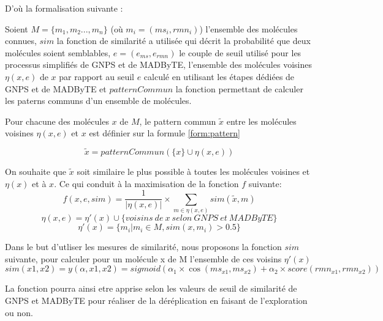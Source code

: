 \documentclass[12pt, french, latin.medieval, a4paper]{report}
\begin{document}
        D’où la formalisation suivante :

        Soient $M =\{ {m_{1}},{m_{2}}...,{m_{n}} \}$ (où $m_{i} = (ms_{i}, rmn_{i})$) l'ensemble des molécules connues, $sim$ la fonction de similarité a utilisée qui décrit la probabilité que deux molécules soient semblables, $e = (e_{ms}, e_{rmn})$ le couple de seuil utilisé pour les processus simplifiés de GNPS et de MADByTE, 
        l'ensemble des molécules voisines $\eta(x,e)$ de $x$ par rapport au seuil $e$ calculé en utilisant les étapes dédiées de GNPS et de MADByTE et $patternCommun$ la fonction permettant de calculer les paterns communs d'un ensemble de molécules.
        
        Pour chacune des molécules $x$ de $M$, le pattern commun $\tilde{x}$ entre les molécules voisines $\eta(x,e)$ et $x$ est définier sur la formule \ref{form:pattern}
        
        \begin{equation}
            \tilde{x} = patternCommun( \{x\} \cup \eta(x,e))
            \label{form:pattern}
        \end{equation}
        
        On souhaite que $\tilde{x}$ soit similaire le plus possible à toutes les molécules voisines et $\eta(x)$ et à $x$. Ce qui conduit à la maximisation de la fonction $f$ suivante:
        \begin{equation}
             f(x, e, sim) =  \frac{1}{|\eta(x,e)|} \times \sum_{ m \in \eta(x,e) } sim(\tilde{x}, m)
        \end{equation}
        \begin{equation}
            \eta(x,e)= \eta'(x) \cup \{voisins\ de\ x\ selon\ GNPS\ et\ MADByTE\}
        \end{equation}
        \begin{equation}
            \eta'(x) = \{ m_{i} | m_{i} \in M , sim(x, m_{i}) > 0.5 \}
        \end{equation}
        
        Dans le but d'utliser les mesures de similarité, nous proposons la fonction $sim$ suivante, pour calculer pour un molécule x de M l'ensemble de ces voisins $\eta'(x)$
        \begin{equation}
            sim(x1,x2)= y(\alpha,x1 ,x2) =  sigmoid( \alpha_{1}\times\cos(ms_{x1}, ms_{x2}) + \alpha_{2}\times{score(rmn_{x1}, rmn_{x2})} )
        \end{equation}

        La fonction pourra ainsi etre apprise selon les valeurs de seuil de similarité de GNPS et MADByTE pour réaliser de la déréplication en faisant de l'exploration ou non.
        
\end{document}
